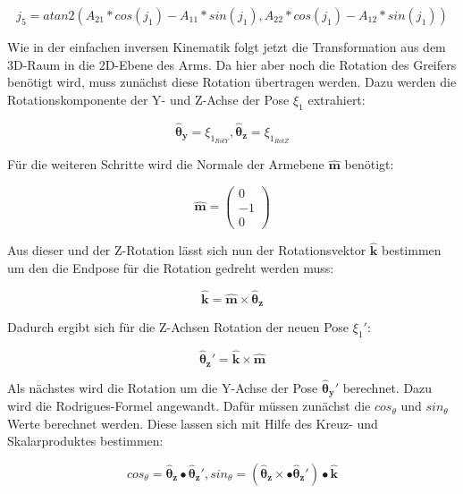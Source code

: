\begin{equation}
j_5 = atan2(A_{21} * cos(j_1) - A_{11} * sin(j_1), A_{22}*cos(j_1)-A_{12} * sin(j_1))
\label{eq:27}
\end{equation}

Wie in der einfachen inversen Kinematik folgt jetzt die Transformation aus dem 3D-Raum in die 2D-Ebene des Arms. Da hier aber noch die Rotation des Greifers benötigt wird, muss zunächst diese Rotation übertragen werden. Dazu werden die Rotationskomponente der Y- und Z-Achse der Pose $\xi_1$ extrahiert:

\begin{equation}
\pmb{\hat{\theta}_y} = \xi_{1_{RotY}}, \pmb{\hat{\theta}_z} = \xi_{1_{RotZ}}  
\label{eq:20}
\end{equation}

Für die weiteren Schritte wird die Normale der Armebene $\pmb{\hat{m}}$ benötigt:

\begin{equation}
\pmb{\hat{m}} = 
\left(\begin{array}{c} 
0 \\
-1\\
0
\end{array}\right)
\label{eq:21}
\end{equation}

Aus dieser und der Z-Rotation lässt sich nun der Rotationsvektor $\pmb{\hat{k}}$ bestimmen um den die Endpose für die Rotation gedreht werden muss:

\begin{equation}
\pmb{\hat{k}} = \pmb{\hat{m}} \times \pmb{\hat{\theta}_z} 
\label{eq:22}
\end{equation}

Dadurch ergibt sich für die Z-Achsen Rotation der neuen Pose $\xi_1'$:

\begin{equation}
\pmb{\hat{\theta}_z'} = \pmb{\hat{k}} \times \pmb{\hat{m}}
\label{eq:23}
\end{equation}

Als nächstes wird die Rotation um die Y-Achse der Pose $\pmb{\hat{\theta}_y'}$ berechnet. Dazu wird die Rodrigues-Formel angewandt. Dafür müssen zunächst die $cos_\theta$ und $sin_\theta$ Werte berechnet werden. Diese lassen sich mit Hilfe des Kreuz- und Skalarproduktes bestimmen:

\begin{equation}
cos_\theta = \pmb{\hat{\theta}_z} \bullet \pmb{\hat{\theta}_z'}, sin_\theta = (\pmb{\hat{\theta}_z} \times \bullet \pmb{\hat{\theta}_z'}) \bullet \pmb{\hat{k}}
\label{eq:24}
\end{equation}

